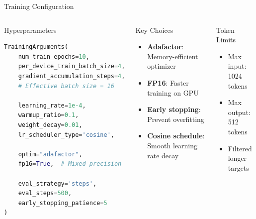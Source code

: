 \begin{frame}[fragile]{Training Configuration}
\begin{columns}
\begin{block}{Hyperparameters}
\begin{lstlisting}[language=Python, basicstyle=\ttfamily\tiny]
TrainingArguments(
    num_train_epochs=10,
    per_device_train_batch_size=4,
    gradient_accumulation_steps=4,
    # Effective batch size = 16

    learning_rate=1e-4,
    warmup_ratio=0.1,
    weight_decay=0.01,
    lr_scheduler_type='cosine',

    optim="adafactor",
    fp16=True,  # Mixed precision

    eval_strategy='steps',
    eval_steps=500,
    early_stopping_patience=5
)
\end{lstlisting}
\end{block}
\begin{block}{Key Choices}
\begin{itemize}
  \item \textbf{Adafactor}: Memory-efficient optimizer
  \item \textbf{FP16}: Faster training on GPU
  \item \textbf{Early stopping}: Prevent overfitting
  \item \textbf{Cosine schedule}: Smooth learning rate decay
\end{itemize}
\end{block}

\begin{block}{Token Limits}
\begin{itemize}
  \item Max input: 1024 tokens
  \item Max output: 512 tokens
  \item Filtered longer targets
\end{itemize}
\end{block}
\end{columns}
\end{frame}

